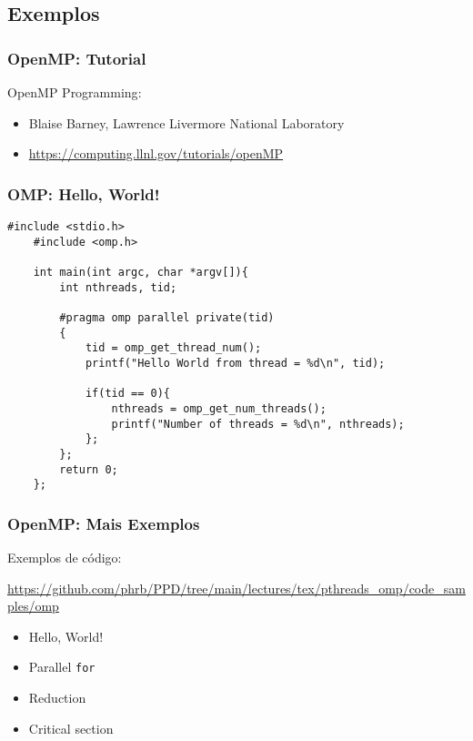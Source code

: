 \documentclass[10pt, compress, aspectratio=169, xcolor={table,usenames,dvipsnames}]{beamer}
\begin{document}
\subsection{Exemplos}

\begin{frame}
    \frametitle{OpenMP: Tutorial}
    \alert{OpenMP Programming}:
    \begin{itemize}
        \item Blaise Barney, Lawrence Livermore National Laboratory
        \item \url{https://computing.llnl.gov/tutorials/openMP}
    \end{itemize}
\end{frame}

\begin{frame}[fragile]
    \frametitle{OMP: Hello, World!}
    \begin{adjustbox}{width=.65\textwidth,center}
    \begin{lstlisting}[basicstyle=\ttfamily\scriptsize]
    #include <stdio.h>
    #include <omp.h>

    int main(int argc, char *argv[]){
        int nthreads, tid;

        #pragma omp parallel private(tid)
        {
            tid = omp_get_thread_num();
            printf("Hello World from thread = %d\n", tid);

            if(tid == 0){
                nthreads = omp_get_num_threads();
                printf("Number of threads = %d\n", nthreads);
            };
        };
        return 0;
    };
    \end{lstlisting}
    \end{adjustbox}
\end{frame}

\begin{frame}
    \frametitle{OpenMP: Mais Exemplos}
    Exemplos de código:

    \url{https://github.com/phrb/PPD/tree/main/lectures/tex/pthreads_omp/code_samples/omp}

    \begin{itemize}
        \item Hello, World!
        \item Parallel \texttt{for}
        \item Reduction
        \item Critical section
    \end{itemize}
\end{frame}
\end{document}
